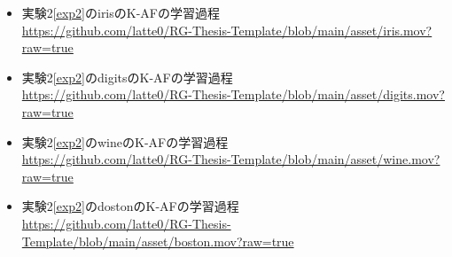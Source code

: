 \begin{itemize}
  \item 実験2\ref{exp2}のirisのK-AFの学習過程 \\ \href{https://github.com/latte0/RG-Thesis-Template/blob/main/asset/iris.mov?raw=true}{https://github.com/latte0/RG-Thesis-Template/blob/main/asset/iris.mov?raw=true}
  \item 実験2\ref{exp2}のdigitsのK-AFの学習過程 \\ \href{https://github.com/latte0/RG-Thesis-Template/blob/main/asset/digits.mov?raw=true}{https://github.com/latte0/RG-Thesis-Template/blob/main/asset/digits.mov?raw=true}
  \item 実験2\ref{exp2}のwineのK-AFの学習過程 \\ \href{https://github.com/latte0/RG-Thesis-Template/blob/main/asset/wine.mov?raw=true}{https://github.com/latte0/RG-Thesis-Template/blob/main/asset/wine.mov?raw=true}
  \item 実験2\ref{exp2}のdostonのK-AFの学習過程 \\ \href{https://github.com/latte0/RG-Thesis-Template/blob/main/asset/boston.mov?raw=true}{https://github.com/latte0/RG-Thesis-Template/blob/main/asset/boston.mov?raw=true}
\end{itemize}

